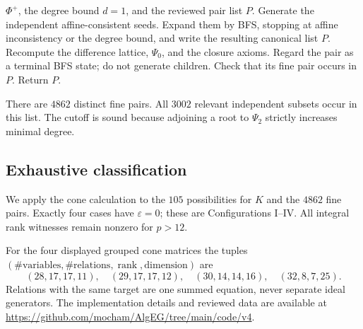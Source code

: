 \begin{tcolorbox}
\begin{algorithmic}[1]
\Require $\Phi^+$, the degree bound $d=1$, and the reviewed pair list $P$.
  \State Generate the independent affine-consistent seeds.
  \State Expand them by BFS, stopping at affine inconsistency or the degree
  bound, and write the resulting canonical list $P$.
\EndIf
{}
  \State Recompute the difference lattice, $\Psi_0$, and the closure axioms.
  \State Regard the pair as a terminal BFS state; do not generate children.
\EndFor
{}
  \State Check that its fine pair occurs in $P$.
\EndFor
\State Return $P$.
\end{algorithmic}
\end{tcolorbox}
\renewcommand{\figurename}{Algorithm}
\label{alg:F4-bounded-bfs}

There are $4862$ distinct fine pairs.  All $3002$ relevant independent subsets
occur in this list.  The cutoff is sound because adjoining a root to $\Psi_2$
strictly increases minimal degree.

\subsection{Exhaustive classification}

We apply the cone calculation to the $105$ possibilities for $K$ and the
$4862$ fine pairs.  Exactly four cases have $\varepsilon=0$; these are
Configurations I--IV.  All integral rank witnesses remain nonzero for
$p>12$.

For the four displayed grouped cone matrices the tuples
$(\#\mathrm{variables},\#\mathrm{relations},\operatorname{rank},
\mathrm{dimension})$ are
\[
(28,17,17,11),\quad(29,17,17,12),\quad
(30,14,14,16),\quad(32,8,7,25).
\]
Relations with the same target are one summed equation, never separate ideal
generators.  The implementation details and reviewed data are available at
\url{https://github.com/mocham/AlgEG/tree/main/code/v4}.

